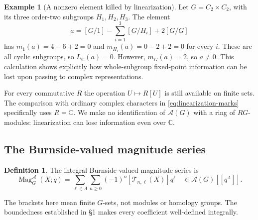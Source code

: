 \documentclass[11pt,a4paper]{article}
\numberwithin{equation}{section}
\theoremstyle{definition}
\newtheorem{definition}[theorem]{Definition}
\newtheorem{example}[theorem]{Example}
\theoremstyle{remark}
\newcommand{\C}{\mathbb C}
\newcommand{\G}{G}
\newcommand{\Mag}{\operatorname{Mag}}
\newcommand{\Burn}{\mathcal A}
\begin{document}
\begin{example}[A nonzero element killed by linearization]
Let $\G=C_2\times C_2$, with its three order-two subgroups
$H_1,H_2,H_3$.  The element
\[
 a=[\G/1]-\sum_{i=1}^3[\G/H_i]+2[\G/\G]
\]
has $m_1(a)=4-6+2=0$ and $m_{H_i}(a)=0-2+2=0$ for every $i$.
These are all cyclic subgroups, so $L_\C(a)=0$.  However,
$m_\G(a)=2$, so $a\ne0$.  This calculation shows explicitly how
whole-subgroup fixed-point information can be lost upon passing to
complex representations.
\end{example}

For every commutative $R$ the operation $U\mapsto R[U]$ is still
available on finite sets.  The comparison with ordinary complex
characters in \eqref{eq:linearization-marks} specifically uses
$R=\C$.  We make no identification of $\Burn(\G)$ with a ring of
$R\G$-modules: linearization can lose information even over $\C$.

\subsection{The Burnside-valued magnitude series}
\label{subsec:burnside-series}

\begin{definition}\label{def:burnside-mag}
The integral Burnside-valued magnitude series is
\begin{equation}\label{eq:burnside-mag}
 \Mag^{\Burn}_\G(X;q)
  =\sum_{\ell\in\Lambda}\sum_{n\geq0}
           (-1)^n[\mathcal T_{n,\ell}(X)]q^\ell
  \quad\in\Burn(\G)[[q^\Lambda]].
\end{equation}
\end{definition}
The brackets here mean finite $\G$-sets, not modules or homology
groups.  The boundedness established in \S1 makes every coefficient
well-defined integrally.
\end{document}

